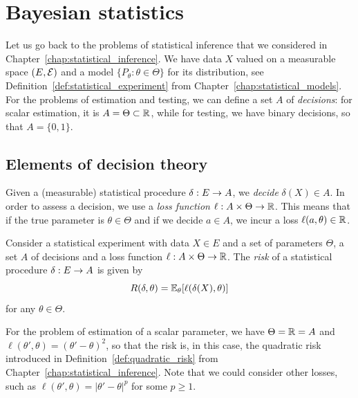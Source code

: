 
\setchapterpreamble[u]{\margintoc}
\chapter{Bayesian statistics}
\label{chap:bayesian_statistics}

Let us go back to the problems of statistical inference that we considered in Chapter~\ref{chap:statistical_inference}.
We have data $X$ valued on a measurable space $(E, \operatorname{{\mathcal E}})$ and a model $\{ P_\theta : \theta \in \Theta\}$ for its distribution, see Definition~\ref{def:statistical_experiment} from Chapter~\ref{chap:statistical_models}.
For the problems of estimation and testing, we can define a set $A$ of \emph{decisions}: for scalar estimation, it is $A = \Theta \subset \mathbb R$, while for testing, we have binary decisions, so that $A = \{ 0, 1 \}$.

\section{Elements of decision theory} %
\label{sec:elements_of_decision_theory}

Given a (measurable) statistical procedure $\delta : E \rightarrow A$, we \emph{decide} $\delta(X) \in A$.
In order to assess a decision, we use a \emph{loss function} $\ell : A \times \Theta \rightarrow \mathbb R$.
This means that if the true parameter is $\theta \in \Theta$ and if we decide $a \in A$, we incur a loss $\ell(a, \theta) \in \mathbb R$.

\begin{definition}
	Consider a statistical experiment with data $X \in E$ and a set of parameters $\Theta$, a set $A$ of decisions and a loss function $\ell : A \times \Theta \rightarrow \mathbb R$. The \emph{risk} of a statistical procedure $\delta : E \rightarrow A$ is given by
	\begin{equation*}
		R(\delta, \theta) = \mathbb E_\theta[ \ell(\delta(X), \theta)]
	\end{equation*}
	for any $\theta \in \Theta$.
\end{definition}

For the problem of estimation of a scalar parameter, we have $\Theta = \mathbb R = A$ and $\ell(\theta', \theta) = (\theta' - \theta)^2$, so that the risk is, in this case, the quadratic risk introduced in Definition~\ref{def:quadratic_risk} from Chapter~\ref{chap:statistical_inference}.
Note that we could consider other losses, such as $\ell(\theta', \theta) = |\theta' - \theta|^p$ for some $p \geq 1$.


